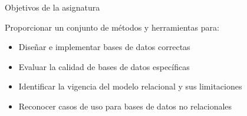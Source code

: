 \begin{frame}{Objetivos de la asignatura}

    \begin{block}{Proporcionar un conjunto de m\'etodos y herramientas para:}
        \pause
        \begin{itemize}[<+->]
            \item Dise\~nar e implementar bases de datos correctas
            \item Evaluar la calidad de bases de datos espec\'ificas
            \item Identificar la vigencia del modelo relacional y sus limitaciones
            \item Reconocer casos de uso para bases de datos no relacionales
        \end{itemize}        
    \end{block}

\end{frame}